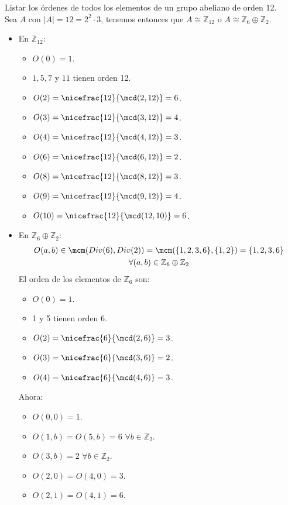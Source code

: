 \begin{ejemplo}
    Listar los órdenes de todos los elementos de un grupo abeliano de orden 12.\\

    \noindent
    Sea $A$ con $|A| = 12 = 2^2\cdot 3$, tenemos entonces que $A\cong \mathbb{Z}_{12}$ o $A\cong \mathbb{Z}_6\oplus \mathbb{Z}_2$.
    \begin{itemize}
        \item En $\mathbb{Z}_{12}$:
            \begin{itemize}
                \item $O(0) = 1$.
                \item $1, 5, 7$ y $11$ tienen orden 12.
                \item $O(2) = \nicefrac{12}{\mcd(2,12)} = 6$.
                \item $O(3) = \nicefrac{12}{\mcd(3,12)} = 4$.
                \item $O(4) = \nicefrac{12}{\mcd(4,12)} = 3$.
                \item $O(6) = \nicefrac{12}{\mcd(6,12)} = 2$.
                \item $O(8) = \nicefrac{12}{\mcd(8,12)} = 3$.
                \item $O(9) = \nicefrac{12}{\mcd(9,12)} = 4$.
                \item $O(10) = \nicefrac{12}{\mcd(12,10)} = 6$.
            \end{itemize}
        \item En $\mathbb{Z}_6\oplus\mathbb{Z}_2$:
            \begin{multline*}
                O(a,b) \in  \mcm(Div(6), Div(2)) = \mcm(\{1,2,3,6\}, \{1,2\}) = \{1,2,3,6\} \\ \forall (a,b)\in \mathbb{Z}_6\oplus\mathbb{Z}_2
            \end{multline*}
            El orden de los elementos de $\mathbb{Z}_6$ son:
            \begin{itemize}
                \item $O(0) = 1$.
                \item 1 y 5 tienen orden 6.
                \item $O(2) = \nicefrac{6}{\mcd(2,6)} = 3$.
                \item $O(3) = \nicefrac{6}{\mcd(3,6)} = 2$.
                \item $O(4) = \nicefrac{6}{\mcd(4,6)} = 3$.
            \end{itemize}
            Ahora:
            \begin{itemize}
                \item $O(0,0) = 1$.
                \item $O(1,b) = O(5,b) = 6$ $\forall b\in \mathbb{Z}_2$.
                \item $O(3, b) = 2$ $\forall b\in \mathbb{Z}_2$.
                \item $O(2, 0) = O(4, 0) = 3$.
                \item $O(2, 1) = O(4, 1) = 6$.
            \end{itemize}
    \end{itemize}
\end{ejemplo}

